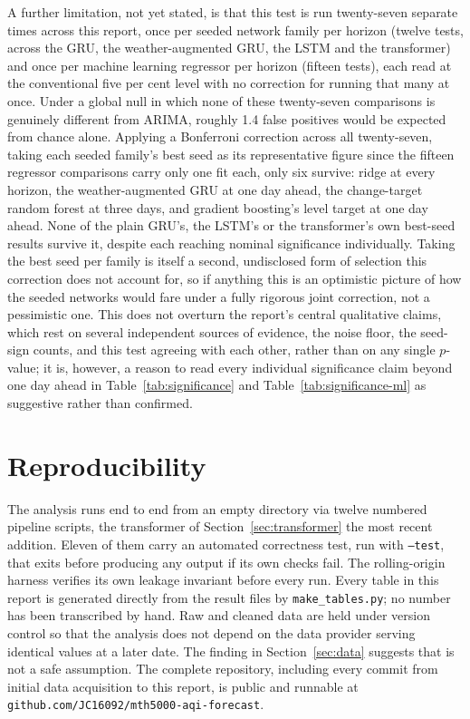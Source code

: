 \documentclass[12pt,a4paper]{report}
\begin{document}
A further limitation, not yet stated, is that this test is run
twenty-seven separate times across this report, once per seeded network
family per horizon (twelve tests, across the GRU, the weather-augmented
GRU, the LSTM and the transformer) and once per machine learning
regressor per horizon (fifteen tests), each read at the conventional five
per cent level with no correction for running that many at once. Under a
global null in which none of these twenty-seven comparisons is genuinely
different from ARIMA, roughly 1.4 false positives would be expected from
chance alone. Applying a Bonferroni correction across all twenty-seven,
taking each seeded family's best seed as its representative figure since
the fifteen regressor comparisons carry only one fit each, only six
survive: ridge at every horizon, the weather-augmented GRU at one day
ahead, the change-target random forest at three days, and gradient
boosting's level target at one day ahead. None of the plain GRU's, the
LSTM's or the transformer's own best-seed results survive it, despite
each reaching nominal significance individually. Taking the best seed per
family is itself a second, undisclosed form of selection this correction
does not account for, so if anything this is an optimistic picture of how
the seeded networks would fare under a fully rigorous joint correction,
not a pessimistic one. This does not overturn the report's central
qualitative claims, which rest on several independent sources of
evidence, the noise floor, the seed-sign counts, and this test agreeing
with each other, rather than on any single $p$-value; it is, however, a
reason to read every individual significance claim beyond one day ahead
in Table~\ref{tab:significance} and Table~\ref{tab:significance-ml} as
suggestive rather than confirmed.

\section{Reproducibility}

The analysis runs end to end from an empty directory via twelve numbered
pipeline scripts, the transformer of Section~\ref{sec:transformer} the most
recent addition. Eleven of them carry an automated correctness test, run with
\texttt{--test}, that exits before producing any output if its own
checks fail. The rolling-origin harness verifies its own leakage
invariant before every run. Every table in this report is generated directly
from the result files by \texttt{make\_tables.py}; no number has been
transcribed by hand. Raw and cleaned data are held under version control so
that the analysis does not depend on the data provider serving identical
values at a later date. The finding in Section~\ref{sec:data} suggests that
is not a safe assumption. The complete repository, including every commit
from initial data acquisition to this report, is public and runnable at
\texttt{github.com/JC16092/mth5000-aqi-forecast}.
\end{document}
